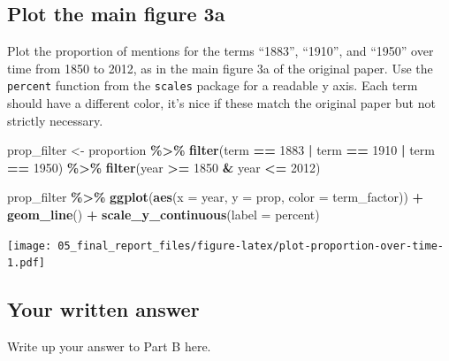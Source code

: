 \documentclass[
]{article}
\newenvironment{Shaded}{\begin{snugshade}}{\end{snugshade}}
\newcommand{\AttributeTok}[1]{\textcolor[rgb]{0.13,0.29,0.53}{#1}}
\newcommand{\DecValTok}[1]{\textcolor[rgb]{0.00,0.00,0.81}{#1}}
\newcommand{\FunctionTok}[1]{\textcolor[rgb]{0.13,0.29,0.53}{\textbf{#1}}}
\newcommand{\NormalTok}[1]{#1}
\newcommand{\OtherTok}[1]{\textcolor[rgb]{0.56,0.35,0.01}{#1}}
\newcommand{\SpecialCharTok}[1]{\textcolor[rgb]{0.81,0.36,0.00}{\textbf{#1}}}
\newcommand{\StringTok}[1]{\textcolor[rgb]{0.31,0.60,0.02}{#1}}
\begin{document}
\hypertarget{plot-the-main-figure-3a}{%
\subsection{Plot the main figure 3a}\label{plot-the-main-figure-3a}}

Plot the proportion of mentions for the terms ``1883'', ``1910'', and
``1950'' over time from 1850 to 2012, as in the main figure 3a of the
original paper. Use the \texttt{percent} function from the
\texttt{scales} package for a readable y axis. Each term should have a
different color, it's nice if these match the original paper but not
strictly necessary.

\begin{Shaded}
\begin{Highlighting}[]
\NormalTok{prop\_filter }\OtherTok{\textless{}{-}}\NormalTok{ proportion }\SpecialCharTok{\%\textgreater{}\%} 
  \FunctionTok{filter}\NormalTok{(term }\SpecialCharTok{==} \StringTok{\textquotesingle{}1883\textquotesingle{}} \SpecialCharTok{|}\NormalTok{ term }\SpecialCharTok{==} \StringTok{\textquotesingle{}1910\textquotesingle{}} \SpecialCharTok{|}\NormalTok{ term }\SpecialCharTok{==} \StringTok{\textquotesingle{}1950\textquotesingle{}}\NormalTok{) }\SpecialCharTok{\%\textgreater{}\%}
    \FunctionTok{filter}\NormalTok{(year }\SpecialCharTok{\textgreater{}=} \DecValTok{1850} \SpecialCharTok{\&}\NormalTok{ year }\SpecialCharTok{\textless{}=} \DecValTok{2012}\NormalTok{)}


\NormalTok{prop\_filter }\SpecialCharTok{\%\textgreater{}\%} 
  \FunctionTok{ggplot}\NormalTok{(}\FunctionTok{aes}\NormalTok{(}\AttributeTok{x =}\NormalTok{ year, }\AttributeTok{y =}\NormalTok{ prop, }\AttributeTok{color =}\NormalTok{ term\_factor)) }\SpecialCharTok{+}
  \FunctionTok{geom\_line}\NormalTok{() }\SpecialCharTok{+}
  \FunctionTok{scale\_y\_continuous}\NormalTok{(}\AttributeTok{label =}\NormalTok{ percent)}
\end{Highlighting}
\end{Shaded}

\texttt{[image: 05\_final\_report\_files/figure-latex/plot-proportion-over-time-1.pdf]}

\hypertarget{your-written-answer-1}{%
\subsection{Your written answer}\label{your-written-answer-1}}

Write up your answer to Part B here.
\end{document}
